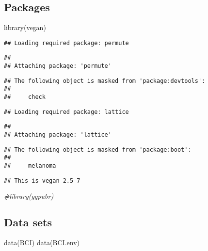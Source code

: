 \documentclass[
]{book}
\newenvironment{Shaded}{\begin{snugshade}}{\end{snugshade}}
\newcommand{\CommentTok}[1]{\textcolor[rgb]{0.56,0.35,0.01}{\textit{#1}}}
\newcommand{\FunctionTok}[1]{\textcolor[rgb]{0.00,0.00,0.00}{#1}}
\newcommand{\NormalTok}[1]{#1}
\begin{document}
\hypertarget{packages-4}{%
\subsection{Packages}\label{packages-4}}

\begin{Shaded}
\begin{Highlighting}[]
\FunctionTok{library}\NormalTok{(vegan)}
\end{Highlighting}
\end{Shaded}

\begin{verbatim}
## Loading required package: permute
\end{verbatim}

\begin{verbatim}
## 
## Attaching package: 'permute'
\end{verbatim}

\begin{verbatim}
## The following object is masked from 'package:devtools':
## 
##     check
\end{verbatim}

\begin{verbatim}
## Loading required package: lattice
\end{verbatim}

\begin{verbatim}
## 
## Attaching package: 'lattice'
\end{verbatim}

\begin{verbatim}
## The following object is masked from 'package:boot':
## 
##     melanoma
\end{verbatim}

\begin{verbatim}
## This is vegan 2.5-7
\end{verbatim}

\begin{Shaded}
\begin{Highlighting}[]
\CommentTok{\#library(ggpubr)}
\end{Highlighting}
\end{Shaded}

\hypertarget{data-sets}{%
\subsection{Data sets}\label{data-sets}}

\begin{Shaded}
\begin{Highlighting}[]
\FunctionTok{data}\NormalTok{(BCI)}
\FunctionTok{data}\NormalTok{(BCI.env)}
\end{Highlighting}
\end{Shaded}
\end{document}
